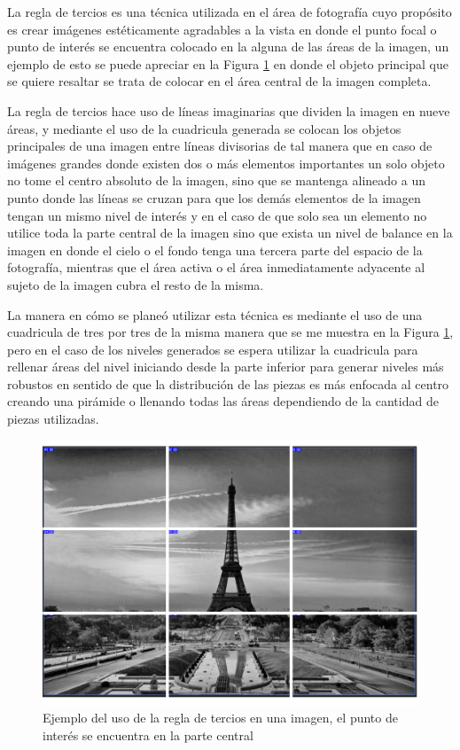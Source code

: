 La regla de tercios es una técnica utilizada en el área de fotografía cuyo
propósito es crear imágenes estéticamente agradables a la vista en donde el
punto focal o punto de interés se encuentra colocado en la alguna de las áreas
de la imagen, un ejemplo de esto se puede apreciar en la Figura
\ref{figure:ruleofthirdsexample} en donde el objeto principal que se quiere
resaltar se trata de colocar en el área central de la imagen completa.

La regla de tercios hace uso de líneas imaginarias que dividen la imagen en nueve
áreas, y mediante el uso de la
cuadricula generada se colocan los objetos principales de una imagen entre
líneas divisorias de tal manera que en caso de imágenes grandes donde existen dos
o más elementos importantes un solo objeto no tome el centro absoluto de la
imagen, sino que se mantenga alineado a un punto donde las líneas se cruzan para
que los demás elementos de la imagen tengan un mismo nivel de interés y en el
caso de que solo sea un elemento no utilice toda la parte central de la imagen
sino que exista un nivel de balance en la imagen en donde el cielo o el fondo
tenga una tercera parte del espacio de la fotografía, mientras que el área
activa o el área inmediatamente adyacente al sujeto de la imagen cubra el
resto de la misma.

La manera en cómo se planeó utilizar esta técnica es mediante el uso de una
cuadricula de tres por tres de la misma manera que se me muestra en la Figura
\ref{figure:ruleofthirdsexample}, pero en el caso de los niveles generados se
espera utilizar la cuadricula para rellenar áreas del nivel iniciando desde la
parte inferior para generar niveles más robustos en sentido de que la
distribución de las piezas es más enfocada al centro creando una pirámide o
llenando todas las áreas dependiendo de la cantidad de piezas utilizadas. 

\begin{figure}
  \centering
  \includegraphics[width=1.0\textwidth]{img/ruleofthirds_example.png}
  \caption{Ejemplo del uso de la regla de tercios en una imagen, el punto de interés se encuentra en la parte central}
  \label{figure:ruleofthirdsexample}
\end{figure}

